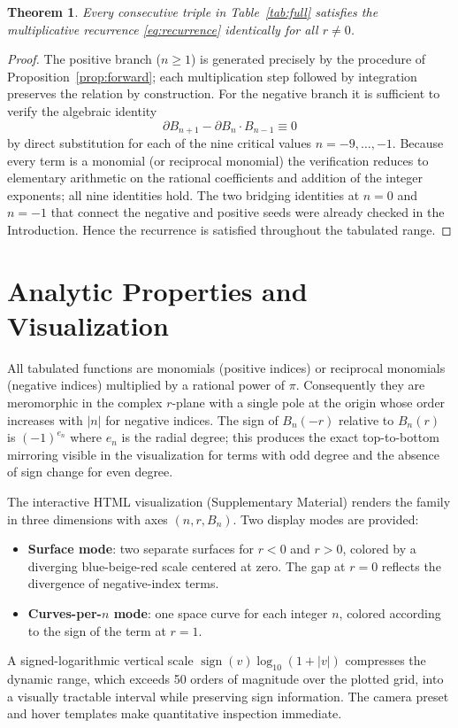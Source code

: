 \documentclass[11pt,a4paper]{article}
\newtheorem{theorem}{Theorem}[section]
\theoremstyle{definition}
\begin{document}
\begin{theorem}
Every consecutive triple in Table~\ref{tab:full} satisfies the multiplicative recurrence \eqref{eq:recurrence} identically for all \(r\neq 0\).
\end{theorem}

\begin{proof}
The positive branch (\(n\geq 1\)) is generated precisely by the procedure of Proposition~\ref{prop:forward}; each multiplication step followed by integration preserves the relation by construction. For the negative branch it is sufficient to verify the algebraic identity
\[
\partial B_{n+1} - \partial B_n \cdot B_{n-1} \equiv 0
\]
by direct substitution for each of the nine critical values \(n=-9,\dots,-1\). Because every term is a monomial (or reciprocal monomial) the verification reduces to elementary arithmetic on the rational coefficients and addition of the integer exponents; all nine identities hold. The two bridging identities at \(n=0\) and \(n=-1\) that connect the negative and positive seeds were already checked in the Introduction. Hence the recurrence is satisfied throughout the tabulated range.
\end{proof}

\section{Analytic Properties and Visualization}

All tabulated functions are monomials (positive indices) or reciprocal monomials (negative indices) multiplied by a rational power of \(\pi\). Consequently they are meromorphic in the complex \(r\)-plane with a single pole at the origin whose order increases with \(|n|\) for negative indices. The sign of \(B_n(-r)\) relative to \(B_n(r)\) is \((-1)^{e_n}\) where \(e_n\) is the radial degree; this produces the exact top-to-bottom mirroring visible in the visualization for terms with odd degree and the absence of sign change for even degree.

The interactive HTML visualization (Supplementary Material) renders the family in three dimensions with axes \((n,r,B_n)\). Two display modes are provided:
\begin{itemize}
\item \textbf{Surface mode}: two separate surfaces for \(r<0\) and \(r>0\), colored by a diverging blue-beige-red scale centered at zero. The gap at \(r=0\) reflects the divergence of negative-index terms.
\item \textbf{Curves-per-\(n\) mode}: one space curve for each integer \(n\), colored according to the sign of the term at \(r=1\).
\end{itemize}
A signed-logarithmic vertical scale \(\operatorname{sign}(v)\log_{10}(1+|v|)\) compresses the dynamic range, which exceeds 50 orders of magnitude over the plotted grid, into a visually tractable interval while preserving sign information. The camera preset and hover templates make quantitative inspection immediate.
\end{document}
